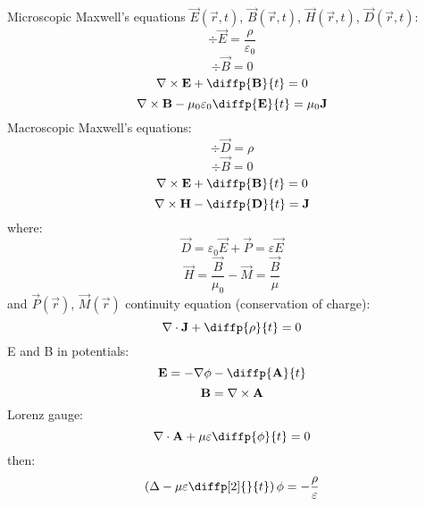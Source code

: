 Microscopic Maxwell's equations $ \vec{E}\left( \vec{r}, t \right) $, $ \vec{B}\left( \vec{r}, t \right) $, $ \vec{H}\left( \vec{r}, t \right) $, $ \vec{D}\left( \vec{r}, t \right) $:
\begin{equation}
\div{\vec{E}} = \frac{\rho}{\varepsilon_0}
\end{equation}
\begin{equation}
\div{\vec{B}} = 0
\end{equation}
\begin{equation}
\rot{\vec{E}} + \diffp{\vec{B}}{t} = 0
\end{equation}
\begin{equation}
\rot{\vec{B}} - \mu_0 \varepsilon_0 \diffp{\vec{E}}{t}= \mu_0 \vec{J}
\end{equation}
Macroscopic Maxwell's equations:
\begin{equation}
\div{\vec{D}} = \rho
\end{equation}
\begin{equation}
\div{\vec{B}} = 0
\end{equation}
\begin{equation}
\rot{\vec{E}} + \diffp{\vec{B}}{t} = 0
\end{equation}
\begin{equation}
\rot{\vec{H}} - \diffp{\vec{D}}{t} = \vec{J}
\end{equation}
where:
\begin{equation}
\vec{D} = \varepsilon_0 \vec{E} + \vec{P} = \varepsilon \vec{E}
\end{equation}
\begin{equation}
\vec{H} = \frac{\vec{B}}{\mu_0} - \vec{M} = \frac{\vec{B}}{\mu} 
\end{equation}
and $ \vec{P}\left(\vec{r} \right) $, $ \vec{M}\left( \vec{r} \right) $
continuity equation (conservation of charge):
\begin{equation}
\div{\vec{J}} + \diffp{\rho}{t} = 0
\end{equation}
E and B in potentials:
\begin{equation}
\vec{E} = -\grad{\phi} - \diffp{\vec{A}}{t}
\end{equation}
\begin{equation}
\mathbf{B} = \nabla \times \mathbf{A}
\end{equation}
Lorenz gauge:
\begin{equation}
\div{\vec{A}} + \mu \varepsilon \diffp{\phi}{t} = 0
\end{equation}
then:
\begin{equation}
\left(\laplace{} - \mu \varepsilon \diffp[2]{}{t} \right)\phi = -\frac{\rho}{\varepsilon}
\end{equation}
